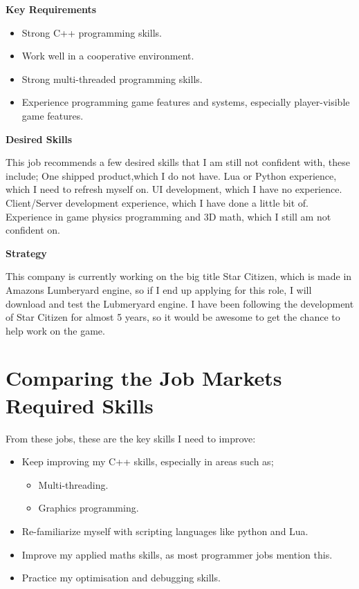 \documentclass{scrartcl}
\begin{document}
\textbf{Key Requirements}
\begin{itemize}
	\item Strong C++ programming skills.
	\item Work well in a cooperative environment.
	\item Strong multi-threaded programming skills.
	\item Experience programming game features and systems, especially player-visible game features.
\end{itemize}


\textbf{Desired Skills}

This job recommends a few desired skills that I am still not confident with, these include;
One shipped product,which I do not have.
 Lua or Python experience, which I need to refresh myself on.
 UI development, which I have no experience.
 Client/Server development experience, which I have done a little bit of.
 Experience in game physics programming and 3D math, which I still am not confident on.


\textbf{Strategy}


This company is currently working on the big title Star Citizen, which is made in Amazons Lumberyard engine, so if I end up applying for this role, I will download and test the Lubmeryard engine.
I have been following the development of Star Citizen for almost 5 years, so it would be awesome to get the chance to help work on the game.





\section{Comparing the Job Markets Required Skills}
From these jobs, these are the key skills I need to improve:

\begin{itemize}
	\item Keep improving my C++ skills, especially in areas such as;
		\begin{itemize}
			\item Multi-threading.
			\item Graphics programming.
		\end{itemize}
	\item Re-familiarize myself with scripting languages like python and Lua.
	\item Improve my applied maths skills, as most programmer jobs mention this. 
	\item Practice my optimisation and debugging skills.
\end{itemize}
\end{document}
